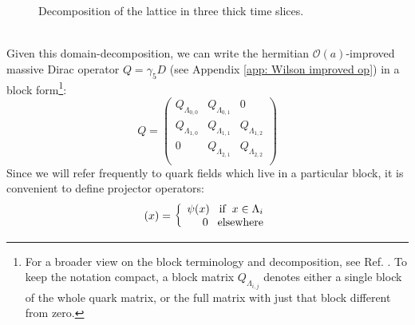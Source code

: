 \begin{figure}

     \caption{Decomposition of the lattice in three thick time slices.}
     \label{fig: Decomp}
 \end{figure}
 \\ Given this domain-decomposition, we can write the hermitian $\mathcal{O}(a)$-improved massive Dirac operator $Q = \gamma_5 D$ (see Appendix \ref{app: Wilson improved op}) in a block form\footnote{For a broader view on the block terminology and decomposition, see Ref. \cite{C__2017}. To keep the
notation compact, a block matrix $Q_{\Lambda_{i,j}}$ denotes either a single block of the whole quark matrix, or the full matrix
with just that block different from zero.}:
 \begin{equation}\label{Q}
    Q = \begin{pmatrix}
 Q_{\Lambda_{0,0}} & Q_{\Lambda_{0,1}} & 0  \\
   Q_{\Lambda_{1,0}} & Q_{\Lambda_{1,1}} & Q_{\Lambda_{1,2}} \\
   0 & Q_{\Lambda_{2,1}} & Q_{\Lambda_{2,2}} \\
\end{pmatrix}
\end{equation}
Since we will refer frequently to quark fields which live in a particular block, it is convenient to define projector operators:
\begin{equation}
    [P_{\Lambda_i}\psi](x) = \left\{ \begin{array}{rcl} \psi(x) \hspace{3mm} \mbox{if} \hspace{2mm} x \in \Lambda_i \\ 0  \hspace{3mm} \mbox{elsewhere}  \\ \end{array} \right.
\end{equation}
